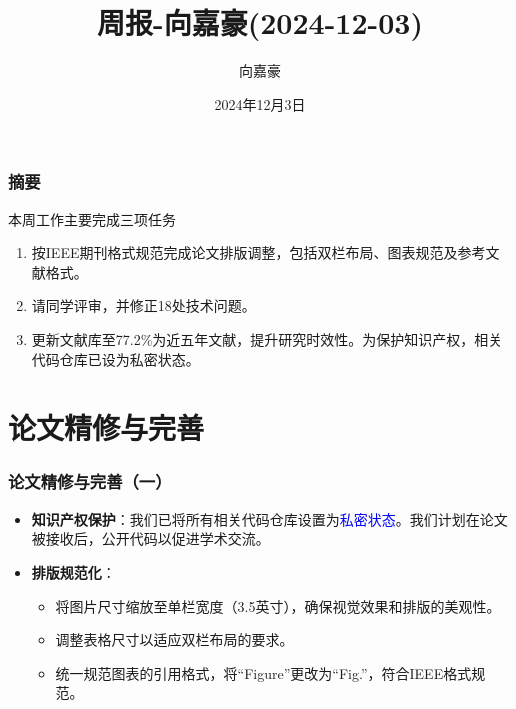 \documentclass{beamer}
\title{\textbf{周报-向嘉豪(2024-12-03)}}
\author{向嘉豪}
\institute{衡阳师范学院}
\date{2024年12月3日}
\begin{document}
\begin{frame}
    \titlepage
\end{frame}

\begin{frame}
    \frametitle{摘要}
    \begin{block}{本周工作主要完成三项任务}
        \begin{enumerate}
            \item 按IEEE期刊格式规范完成论文排版调整，包括双栏布局、图表规范及参考文献格式。
            \item 请同学评审，并修正18处技术问题。
            \item 更新文献库至77.2\%为近五年文献，提升研究时效性。为保护知识产权，相关代码仓库已设为私密状态。
        \end{enumerate}
    \end{block}
   
\end{frame}
\section{论文精修与完善}

\begin{frame}
    \frametitle{论文精修与完善（一）}

    \begin{itemize}
        \item \textbf{知识产权保护}：我们已将所有相关代码仓库设置为\textcolor{blue}{私密状态}。我们计划在论文被接收后，公开代码以促进学术交流。

        \item \textbf{排版规范化}：
        \begin{itemize}
            \item 将图片尺寸缩放至单栏宽度（3.5英寸），确保视觉效果和排版的美观性。
            \item 调整表格尺寸以适应双栏布局的要求。
            \item 统一规范图表的引用格式，将“Figure”更改为“Fig.”，符合IEEE格式规范。
        \end{itemize}
    \end{itemize}
\end{frame}
\end{document}
